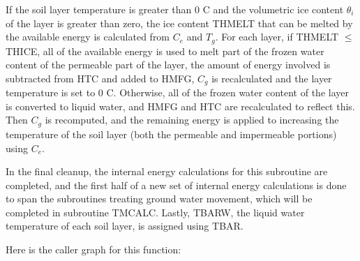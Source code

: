 If the soil layer temperature is greater than 0 C and the volumetric ice content $\theta_i$ of the layer is greater than zero, the ice content T\+H\+M\+E\+L\+T that can be melted by the available energy is calculated from $C_e$ and $T_g$. For each layer, if T\+H\+M\+E\+L\+T $\leq$ T\+H\+I\+C\+E, all of the available energy is used to melt part of the frozen water content of the permeable part of the layer, the amount of energy involved is subtracted from H\+T\+C and added to H\+M\+F\+G, $C_g$ is recalculated and the layer temperature is set to 0 C. Otherwise, all of the frozen water content of the layer is converted to liquid water, and H\+M\+F\+G and H\+T\+C are recalculated to reflect this. Then $C_g$ is recomputed, and the remaining energy is applied to increasing the temperature of the soil layer (both the permeable and impermeable portions) using $C_e$.

In the final cleanup, the internal energy calculations for this subroutine are completed, and the first half of a new set of internal energy calculations is done to span the subroutines treating ground water movement, which will be completed in subroutine T\+M\+C\+A\+L\+C. Lastly, T\+B\+A\+R\+W, the liquid water temperature of each soil layer, is assigned using T\+B\+A\+R.

Here is the caller graph for this function\+:


